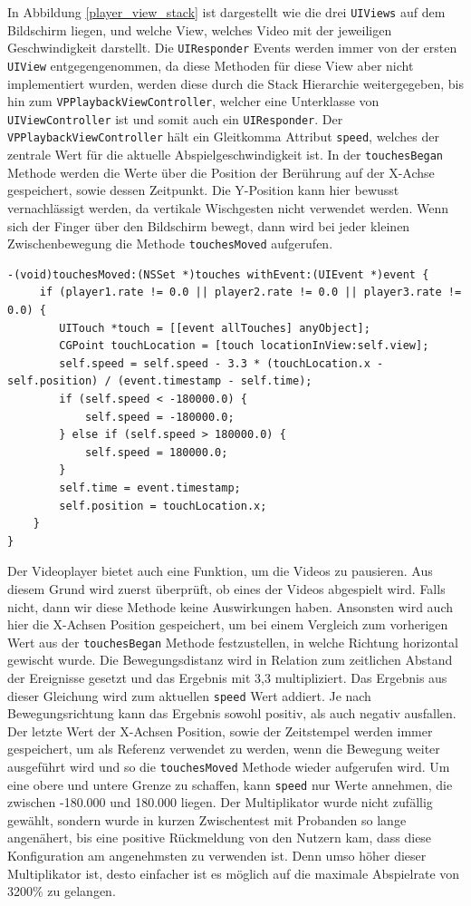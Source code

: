 \documentclass[11pt,a4paper]{report}
\begin{document}
In Abbildung \ref{player_view_stack} ist dargestellt wie die drei \texttt{UIViews} auf dem Bildschirm liegen, und welche View, welches Video mit der jeweiligen Geschwindigkeit darstellt. Die \texttt{UIResponder} Events werden immer von der ersten \texttt{UIView} entgegengenommen, da diese Methoden für diese View aber nicht implementiert wurden, werden diese durch die Stack Hierarchie weitergegeben, bis hin zum \texttt{VPPlaybackViewController}, welcher eine Unterklasse von \texttt{UIViewController} ist und somit auch ein \texttt{UIResponder}. Der \texttt{VPPlaybackViewController} hält ein Gleitkomma Attribut \texttt{speed}, welches der zentrale Wert für die aktuelle Abspielgeschwindigkeit ist. In der \texttt{touchesBegan} Methode werden die Werte über die Position der Berührung auf der X-Achse gespeichert, sowie dessen Zeitpunkt. Die Y-Position kann hier bewusst vernachlässigt werden, da vertikale Wischgesten nicht verwendet werden. Wenn sich der Finger über den Bildschirm bewegt, dann wird bei jeder kleinen Zwischenbewegung die Methode \texttt{touchesMoved} aufgerufen.
\begin{lstlisting}
-(void)touchesMoved:(NSSet *)touches withEvent:(UIEvent *)event {
	 if (player1.rate != 0.0 || player2.rate != 0.0 || player3.rate != 0.0) {
	 	UITouch *touch = [[event allTouches] anyObject];
	 	CGPoint touchLocation = [touch locationInView:self.view];
	 	self.speed = self.speed - 3.3 * (touchLocation.x - self.position) / (event.timestamp - self.time);
	 	if (self.speed < -180000.0) {
		 	self.speed = -180000.0;
	 	} else if (self.speed > 180000.0) {
	 		self.speed = 180000.0;
	 	}
	 	self.time = event.timestamp;
	 	self.position = touchLocation.x;
    }
}
\end{lstlisting}
Der Videoplayer bietet auch eine Funktion, um die Videos zu pausieren. Aus diesem Grund wird zuerst überprüft, ob eines der Videos abgespielt wird. Falls nicht, dann wir diese Methode keine Auswirkungen haben. Ansonsten wird auch hier die X-Achsen Position gespeichert, um bei einem Vergleich zum vorherigen Wert aus der \texttt{touchesBegan} Methode festzustellen, in welche Richtung horizontal gewischt wurde. Die Bewegungsdistanz wird in Relation zum zeitlichen Abstand der Ereignisse gesetzt und das Ergebnis mit 3,3 multipliziert. Das Ergebnis aus dieser Gleichung wird zum aktuellen \texttt{speed} Wert addiert. Je nach Bewegungsrichtung kann das Ergebnis sowohl positiv, als auch negativ ausfallen. Der letzte Wert der X-Achsen Position, sowie der Zeitstempel werden immer gespeichert, um als Referenz verwendet zu werden, wenn die Bewegung weiter ausgeführt wird und so die \texttt{touchesMoved} Methode wieder aufgerufen wird. Um eine obere und untere Grenze zu schaffen, kann \texttt{speed} nur Werte annehmen, die zwischen -180.000 und 180.000 liegen. Der Multiplikator wurde nicht zufällig gewählt, sondern wurde in kurzen Zwischentest mit Probanden so lange angenähert, bis eine positive Rückmeldung von den Nutzern kam, dass diese Konfiguration am angenehmsten zu verwenden ist. Denn umso höher dieser Multiplikator ist, desto einfacher ist es möglich auf die maximale Abspielrate von 3200\% zu gelangen.
\end{document}
